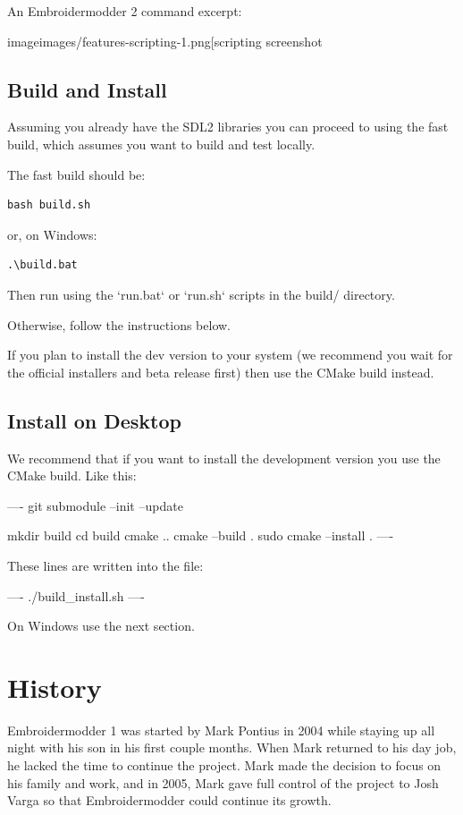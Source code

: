 An Embroidermodder 2 command excerpt:

image{images/features-scripting-1.png[scripting screenshot}

\subsection{Build and Install}

Assuming you already have the SDL2 libraries you can proceed to using the fast build, which
assumes you want to build and test locally.

The fast build should be:

\begin{verbatim}
bash build.sh
\end{verbatim}

or, on Windows:

\begin{verbatim}
.\build.bat
\end{verbatim}

Then run using the `run.bat` or `run.sh` scripts in the build/ directory.

Otherwise, follow the instructions below.

If you plan to install the dev version to your system (we recommend you wait
for the official installers and beta release first) then use the CMake build
instead.

\subsection{Install on Desktop}

We recommend that if you want to install the development version you use the CMake build. Like
this:

----
git submodule --init --update

mkdir build
cd build
cmake ..
cmake --build .
sudo cmake --install .
----

These lines are written into the file:

----
./build_install.sh
----

On Windows use the next section.

\section{History}

Embroidermodder 1 was started by Mark Pontius in 2004 while staying up all night with his son in his first couple months. When Mark returned
to his day job, he lacked the time to continue the project. Mark made the decision to focus on his family and work, and in
2005, Mark gave full control of the project to Josh Varga so that Embroidermodder could continue its growth.


